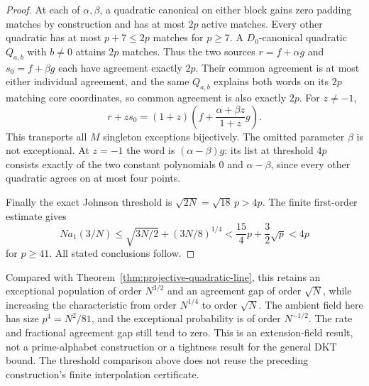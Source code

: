 \begin{proof}
At each of $\alpha,\beta$, a quadratic canonical on either block gains
zero padding matches by construction and has at most $2p$ active matches.
Every other quadratic has at most $p+7\le2p$ matches for $p\ge7$.
A $D_0$-canonical quadratic $Q_{a,b}$ with $b\ne0$ attains $2p$ matches.
Thus the two sources $r=f+\alpha g$ and $s_0=f+\beta g$ each have
agreement exactly $2p$. Their common agreement is at most either
individual agreement, and the same $Q_{a,b}$ explains both words on its
$2p$ matching core coordinates, so common agreement is also exactly $2p$.
For $z\ne-1$,
\[
 r+zs_0=(1+z)\left(f+\frac{\alpha+\beta z}{1+z}g\right).
\]
This transports all $M$ singleton exceptions bijectively. The omitted
parameter $\beta$ is not exceptional. At $z=-1$ the word is
$(\alpha-\beta)g$: its list at threshold $4p$ consists exactly of the
two constant polynomials $0$ and $\alpha-\beta$, since every other
quadratic agrees on at most four points.

Finally the exact Johnson threshold is $\sqrt{2N}=\sqrt{18}\,p>4p$.
The finite first-order estimate gives
\[
 N a_1(3/N)\le \sqrt{3N/2}+(3N/8)^{1/4}
 <\frac{15}{4}p+\frac32\sqrt p<4p
\]
for $p\ge41$. All stated conclusions follow.
\end{proof}

Compared with Theorem~\ref{thm:projective-quadratic-line}, this retains
an exceptional population of order $N^{3/2}$ and an agreement gap of
order $\sqrt N$, while increasing the characteristic from order
$N^{1/4}$ to order $\sqrt N$. The ambient field here has size
$p^4=N^2/81$, and the exceptional probability is of order $N^{-1/2}$.
The rate and fractional agreement gap still tend to zero. This is an
extension-field result, not a prime-alphabet construction or a tightness
result for the general DKT bound. The threshold comparison above does
not reuse the preceding construction's finite interpolation certificate.
